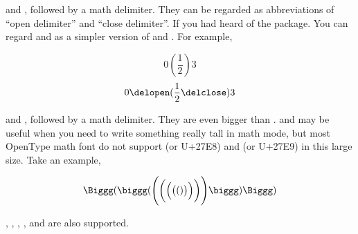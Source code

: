 \documentclass[11pt,letterpaper]{article}
\begin{document}
 and , followed by a math delimiter. They can be
regarded as abbreviations of ``open delimiter'' and ``close delimiter''. If
you had heard of the  package. You can regard 
and  as a simpler version of  and .
For example,
\begin{example}
\[    0 \left(\frac12\right) 3    \]
\[ 0 \delopen(\frac12\delclose) 3 \]
\end{example}

 and , followed by a math delimiter. They are even bigger
than .  and  may be useful when you need to write
something really tall in math mode, but most OpenType math font do not support
 (or U+27E8) and  (or U+27E9) in this large size. Take
an example,
\begin{example}
\[\Biggg(\biggg(\Bigg(\bigg(\Big(\big((
)\big)\Big)\bigg)\Bigg)\biggg)\Biggg)\]
\end{example}
, , , ,  and 
are also supported.
\end{document}
